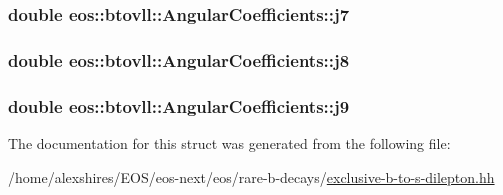 \label{structeos_1_1btovll_1_1AngularCoefficients_a131fac85c7f41b3f45fa48d813cfe5fe}
\hypertarget{structeos_1_1btovll_1_1AngularCoefficients_a4315cb971112dcdab72fd3f35d32b0c1}{
\subsubsection[{j7}]{\setlength{\rightskip}{0pt plus 5cm}double {\bf eos::btovll::AngularCoefficients::j7}}}
\label{structeos_1_1btovll_1_1AngularCoefficients_a4315cb971112dcdab72fd3f35d32b0c1}
\hypertarget{structeos_1_1btovll_1_1AngularCoefficients_ae45771328384f52d01da8de89ac47daa}{
\subsubsection[{j8}]{\setlength{\rightskip}{0pt plus 5cm}double {\bf eos::btovll::AngularCoefficients::j8}}}
\label{structeos_1_1btovll_1_1AngularCoefficients_ae45771328384f52d01da8de89ac47daa}
\hypertarget{structeos_1_1btovll_1_1AngularCoefficients_a316582a2eb00530ecde513187e29fe18}{
\subsubsection[{j9}]{\setlength{\rightskip}{0pt plus 5cm}double {\bf eos::btovll::AngularCoefficients::j9}}}
\label{structeos_1_1btovll_1_1AngularCoefficients_a316582a2eb00530ecde513187e29fe18}


The documentation for this struct was generated from the following file:\begin{DoxyCompactItemize}
\item 
/home/alexshires/EOS/eos-\/next/eos/rare-\/b-\/decays/\hyperlink{exclusive-b-to-s-dilepton_8hh}{exclusive-\/b-\/to-\/s-\/dilepton.hh}\end{DoxyCompactItemize}
